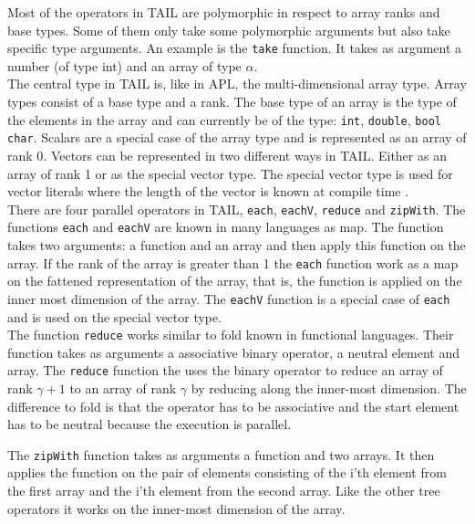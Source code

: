 \documentclass[11pt]{article}
\begin{document}
Most of the operators in TAIL are polymorphic in respect to array ranks and base types.
Some of them only take some polymorphic arguments but also take specific type arguments.
An example is the {\tt take} function. It takes as argument a number (of type int) and an array of type $\alpha$.\\

The central type in TAIL is, like in APL, the multi-dimensional array type.
Array types consist of a base type and a rank.
The base type of an array is the type of the elements in the array and can currently be of the
type: {\tt int}, {\tt double}, {\tt bool} {\tt char}. 
Scalars are a special case of the array type and is represented as an array of rank 0. 
Vectors can be represented in two different ways in TAIL.
Either as an array of rank 1 or as the special vector type.
The special vector type is used for vector literals where the length of the vector is known at compile time \cite{ElsmanDybdal:Array:2014}. \\


There are four parallel operators in TAIL, {\tt each}, {\tt eachV}, {\tt reduce} and {\tt zipWith}.
The functions {\tt each} and {\tt eachV} are known in many languages as map.
The function takes two arguments: a function and an array and then apply this function on the array.
If the rank of the array is greater than 1 the {\tt each} function work as a map on the fattened representation of the array,
that is, the function is applied on the inner most dimension of the array.
The {\tt eachV} function is a special case of {\tt each} and is used on the special vector type.\\

The function {\tt reduce} works similar to fold known in functional languages.
Their function takes as arguments a associative binary operator, a neutral element and array.
The {\tt reduce} function the uses the binary operator 
to reduce an array of rank $\gamma+1$ to an array of rank $\gamma$ by reducing along the inner-most dimension.
The difference to fold is that the operator has to be associative and the start element has to be neutral
because the execution is parallel.

The {\tt zipWith} function takes as arguments a function and two arrays.
It then applies the function on the pair of elements consisting of the i'th element
from the first array and the i'th element from the second array.
Like the other tree operators it works on the inner-most dimension of the array\cite{ElsmanDybdal:Array:2014}\cite{TorbenMogensen}. \\
\end{document}
